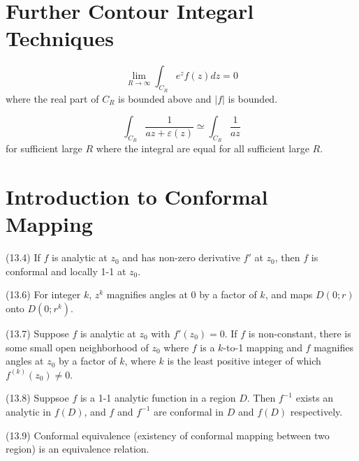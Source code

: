 \documentclass{article}
\begin{document}
\section{Further Contour Integarl Techniques}

\begin{proposition}
  \[\lim_{R \to \infty} \int_{C_R} e^z f(z) dz = 0\]
  where the real part of \(C_R\) is bounded above
  and \(|f|\) is bounded.
\end{proposition}

\begin{proposition}
  \[\int_{C_R} \frac{1}{az + \varepsilon(z)} \simeq \int_{C_R} \frac{1}{az}\]
  for sufficient large \(R\) where the integral are equal for all sufficient large \(R\).
\end{proposition}

\section{Introduction to Conformal Mapping}

\begin{theorem}(13.4)
  If \(f\) is analytic at \(z_0\) and has non-zero derivative \(f'\) at \(z_0\),
  then \(f\) is conformal and locally 1-1 at \(z_0\).
\end{theorem}

\begin{theorem}(13.6)
  For integer \(k\),
  \(z^k\) magnifies angles at \(0\) by a factor of \(k\),
  and maps \(D(0; r)\) onto \(D(0; r^k)\).
\end{theorem}

\begin{theorem}(13.7)
  Suppose \(f\) is analytic at \(z_0\) with \(f'(z_0) = 0\).
  If \(f\) is non-constant,
  there is some small open neighborhood of \(z_0\)
  where \(f\) is a \(k\)-to-1 mapping
  and \(f\) magnifies angles at \(z_0\) by a factor of \(k\),
  where \(k\) is the least positive integer of which \(f^{(k)}(z_0) \neq 0\).
\end{theorem}

\begin{theorem}(13.8)
  Suppsoe \(f\) is a 1-1 analytic function in a region \(D\).
  Then \(f^{-1}\) exists an analytic in \(f(D)\),
  and \(f\) and \(f^{-1}\) are conformal in \(D\) and \(f(D)\) respectively.
\end{theorem}

\begin{theorem}(13.9)
  Conformal equivalence (existency of conformal mapping between two region)
  is an equivalence relation.
\end{theorem}
\end{document}
